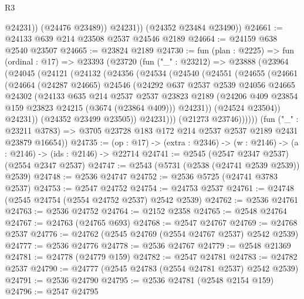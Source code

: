 \begin{lexlean}{R3}
\begin{coremodule}
                @24231))
            (@24476 @23489))
          @24231))
      (@24352 @23484 @23490))
@24661 := @24133 @639 @214 @23508 @2537 @24546 @2189
@24664 := @24159 @638 @2540 @23507
@24665 := @23824 @2189
@24730 := fun (plan : @2225) =>
  fun (ordinal : @17) =>
  @23393
    (@23720
      (fun ("_" : @23212) =>
      @23888
        (@23964
          (@24045
            (@24121
              (@24132
                (@24356
                  (@24534
                    (@24540
                      (@24551
                        (@24655
                          (@24661
                            (@24664
                              (@24287 @24665)
                              @24546
                              (@24292
                                @637
                                @2537
                                @2539
                                @24056
                                @24665
                                @24302
                                (@24133
                                  @635
                                  @214
                                  @2537
                                  @2537
                                  @23823
                                  @2189
                                  (@24206 @409 @23854 @159 @23823 @24215 (@3674 (@23864 @409)))
                                  @24231))
                              (@24524 @23504))
                            @24231))
                        (@24352 @23499 @23505))
                      @24231)))
                (@21273 @23746))))))
      (fun ("_" : @23211 @3783) =>
      @3705 @23728 @183 @172 @214 @2537 @2537 @2189 @2431 @23879 @16654))
@24735 := (op : @17) -> (extra : @2346) -> (w : @2146) -> (a : @2146) -> (ids : @2146) -> @22714
@24741 := @2545 (@2547 @2347 @2537) (@2554 @2347 @2537)
@24747 := @2543 (@5731 (@2538 (@24741 @2539 @2539)) @2539)
@24748 := @2536 @24747
@24752 := @2536 @5725 (@24741 @3783 @2537)
@24753 := @2547 @24752
@24754 := @24753 @2537
@24761 := @24748 (@2545 @24754 (@2554 @24752 @2537) @2542 @2539)
@24762 := @2536 @24761
@24763 := @2536 @24752
@24764 := @2152 @2358
@24765 := @2548 @24764
@24767 := @24763 (@24765 @693)
@24768 := @2547 @24767
@24769 := @24768 @2537
@24776 := @24762 (@2545 @24769 (@2554 @24767 @2537) @2542 @2539)
@24777 := @2536 @24776
@24778 := @2536 @24767
@24779 := @2548 @21369
@24781 := @24778 (@24779 @159)
@24782 := @2547 @24781
@24783 := @24782 @2537
@24790 := @24777 (@2545 @24783 (@2554 @24781 @2537) @2542 @2539)
@24791 := @2536 @24790
@24795 := @2536 @24781 (@2548 @2154 @159)
@24796 := @2547 @24795

\end{coremodule}
\end{lexlean}
